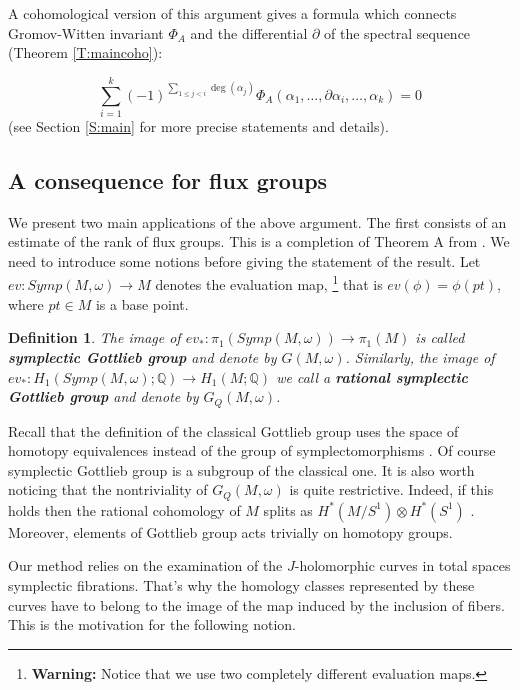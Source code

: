 \documentclass[a4paper,14pt]{article}
\newcommand{\B}[1]{\mathbb #1}
\newcommand{\al}{{\alpha}}
\newcommand{\om}{{\omega}}
\newcommand{\Mo}{(M,\omega )}
\newtheorem{defin}[theorem]{Definition}
\numberwithin{equation}{section}
\begin{document}
A cohomological
version of this argument gives a formula which connects 
Gromov-Witten invariant $\Phi _A $ and the differential 
$\partial $ of the spectral sequence 
(Theorem \ref{T:maincoho}):

$$\sum _{i=1}^k (-1)^{\sum _{1\leq j < i}\deg (\al_j)} 
\Phi _A (\al _1, \dots ,\partial \al_i, \dots ,\al_k)=0 $$
 (see Section \ref{S:main}
for more precise statements and details).


\subsection{A consequence for flux groups}

We present two main applications of the above argument. The first
consists of an estimate of the rank of flux groups. This is
a completion of Theorem A from \cite{k}. We need to introduce
some notions before giving the statement of the result.
Let $ev:Symp\Mo \to M$ denotes the evaluation map,
\footnote{ {\bf Warning:} Notice that we use two completely
different evaluation maps. }
 that is
$ev(\phi )=\phi (pt)$, where $pt\in M$ is a base point.

\begin{defin}\label{D:got}
The image of
$ev_*:\pi_1(Symp\Mo )\to \pi_1(M)$
is called
{\bf symplectic Gottlieb group} and denote
by $G \Mo $. Similarly, the image of
$ev_*:H_1(Symp\Mo ;\B Q)\to H_1(M;\B Q)$
we call a
{\bf rational symplectic Gottlieb group} and denote
by $G_{Q}\Mo $. 
\end{defin}

Recall that the definition of the classical Gottlieb
group uses the space of homotopy equivalences instead of
the group of symplectomorphisms \cite{got}. 
Of course symplectic Gottlieb group is a subgroup of
the classical one.
It is also
worth noticing that the nontriviality of 
$G_Q(M,\om )$ is quite restrictive. Indeed, if this holds
then the rational cohomology of $M$ splits as 
$H^*(M\slash S^1)\otimes H^*(S^1)$ \cite{lm}. Moreover,
elements of Gottlieb group acts trivially on homotopy
groups.

Our method relies on the examination of the $J$-holomorphic
curves in  total spaces symplectic fibrations. 
That's why the homology classes
represented by these curves have to belong to the image
of the map induced by the inclusion of fibers.
This is the motivation for the following notion.
\end{document}
